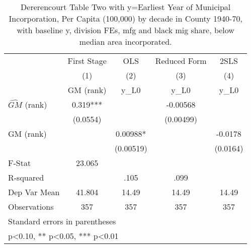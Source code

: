 \begin{table}[htbp]\centering
\def\sym#1{\ifmmode^{#1}\else\(^{#1}\)\fi}
\caption{Dererencourt Table Two with y=Earliest Year of Municipal Incorporation, Per Capita (100,000) by decade in County 1940-70, with baseline y, division FEs, mfg and black mig share, below median area incorporated.}
\begin{tabular}{l*{4}{c}}
\toprule
                    & First Stage   &         OLS   &Reduced Form   &        2SLS   \\
                    &\multicolumn{1}{c}{(1)}&\multicolumn{1}{c}{(2)}&\multicolumn{1}{c}{(3)}&\multicolumn{1}{c}{(4)}\\
                    &\multicolumn{1}{c}{GM  (rank)}&\multicolumn{1}{c}{y\_L0}&\multicolumn{1}{c}{y\_L0}&\multicolumn{1}{c}{y\_L0}\\
\midrule
$\hat{GM}$ (rank)   &       0.319***&               &    -0.00568   &               \\
                    &    (0.0554)   &               &   (0.00499)   &               \\
\addlinespace
GM  (rank)          &               &     0.00988*  &               &     -0.0178   \\
                    &               &   (0.00519)   &               &    (0.0164)   \\
\midrule
F-Stat              &      23.065   &               &               &               \\
R-squared           &               &        .105   &        .099   &               \\
Dep Var Mean        &      41.804   &       14.49   &       14.49   &       14.49   \\
Observations        &         357   &         357   &         357   &         357   \\
\bottomrule
\multicolumn{5}{l}{\footnotesize Standard errors in parentheses}\\
\multicolumn{5}{l}{\footnotesize * p<0.10, ** p<0.05, *** p<0.01}\\
\end{tabular}
\end{table}
